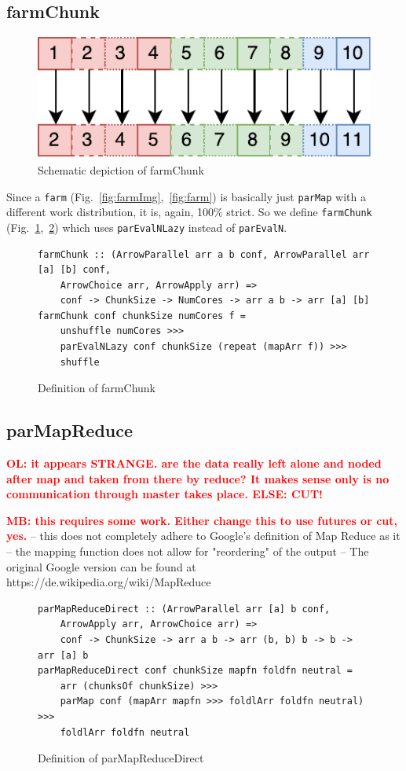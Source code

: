 \documentclass{jfp1}
\newcommand{\inlinecode}[1]{\texttt{#1}}
\newcommand{\comm}[2]{\textcolor{red}{\bfseries #1: #2}}
\newcommand{\olcomment}[1]{\comm{OL}{#1}}
\newcommand{\mbcomment}[1]{\comm{MB}{#1}}
\begin{document}
\subsection{farmChunk}
\begin{figure}[h]
	\includegraphics[scale=0.7]{images/farmChunk}
\caption{Schematic depiction of farmChunk}
\label{fig:farmChunkImg}
\end{figure}
Since a \inlinecode{farm} (Fig.~\ref{fig:farmImg},~\ref{fig:farm}) is basically just \inlinecode{parMap} with a different work distribution, it is, again, 100\% strict. So we define \inlinecode{farmChunk} (Fig.~\ref{fig:farmChunkImg},~\ref{fig:farmChunk}) which uses \inlinecode{parEvalNLazy} instead of \inlinecode{parEvalN}.
\begin{figure}[h]
\begin{lstlisting}[frame=htrbl]
farmChunk :: (ArrowParallel arr a b conf, ArrowParallel arr [a] [b] conf,
	ArrowChoice arr, ArrowApply arr) =>
	conf -> ChunkSize -> NumCores -> arr a b -> arr [a] [b]
farmChunk conf chunkSize numCores f =
	unshuffle numCores >>>
	parEvalNLazy conf chunkSize (repeat (mapArr f)) >>>
	shuffle
\end{lstlisting}
\caption{Definition of farmChunk}
\label{fig:farmChunk}
\end{figure}

\subsection{parMapReduce}
\olcomment{it appears STRANGE. are the data really left alone and noded after map and taken from there by reduce? It makes sense only is no communication through master takes place. ELSE: CUT!}


\mbcomment{this requires some work. Either change this to use futures or cut, yes.}
-- this does not completely adhere to Google's definition of Map Reduce as it
-- the mapping function does not allow for "reordering" of the output
-- The original Google version can be found at https://de.wikipedia.org/wiki/MapReduce

\begin{figure}[h]
\begin{lstlisting}[frame=htrbl]
parMapReduceDirect :: (ArrowParallel arr [a] b conf,
	ArrowApply arr, ArrowChoice arr) =>
	conf -> ChunkSize -> arr a b -> arr (b, b) b -> b -> arr [a] b
parMapReduceDirect conf chunkSize mapfn foldfn neutral =
	arr (chunksOf chunkSize) >>>
	parMap conf (mapArr mapfn >>> foldlArr foldfn neutral) >>>
	foldlArr foldfn neutral
\end{lstlisting}
\caption{Definition of parMapReduceDirect}
\label{fig:parMapReduceDirect}
\end{figure}
\end{document}

